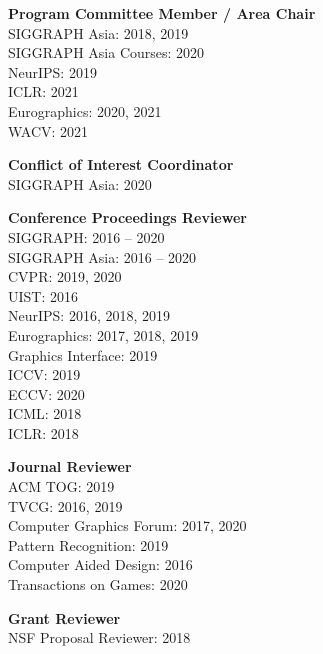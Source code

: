 \documentclass[line,margin]{res}
\begin{document}
\begin{resume}
\textbf{Program Committee Member / Area Chair}\\
SIGGRAPH Asia: 2018, 2019\\
SIGGRAPH Asia Courses: 2020\\
NeurIPS: 2019\\
ICLR: 2021\\
Eurographics: 2020, 2021\\
WACV: 2021

\textbf{Conflict of Interest Coordinator}\\
SIGGRAPH Asia: 2020

\textbf{Conference Proceedings Reviewer}\\
SIGGRAPH: 2016 -- 2020\\
SIGGRAPH Asia: 2016 -- 2020\\
CVPR: 2019, 2020\\
UIST: 2016\\
NeurIPS: 2016, 2018, 2019\\
Eurographics: 2017, 2018, 2019\\
Graphics Interface: 2019\\
ICCV: 2019\\
ECCV: 2020\\
ICML: 2018\\
ICLR: 2018

\textbf{Journal Reviewer}\\
ACM TOG: 2019\\
TVCG: 2016, 2019\\
Computer Graphics Forum: 2017, 2020\\
Pattern Recognition: 2019\\
Computer Aided Design: 2016\\
Transactions on Games: 2020

\textbf{Grant Reviewer}\\
NSF Proposal Reviewer: 2018







\end{resume}
\end{document}

